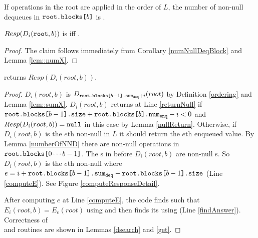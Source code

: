 \begin{corollary}\label{numNullDeqBlock}
  If operations in the root are applied in the order of $L$, the number of non-null dequeues in ${\normalfont{\texttt{root.blocks[}}}b{\normalfont{\texttt{]}}}$ is .
\end{corollary}

\begin{lemma}\label{nullReturn}
$Resp(D_i({\normalfont{\texttt{root}}},b))$ is  iff .
\end{lemma}
\begin{proof}
The claim follows immediately from Corollary  \ref{numNullDeqBlock} and Lemma \ref{lem::numX}.
\end{proof}

\begin{lemma}\label{computeHead}
 returns $Resp(D_i(root,b))$.
\end{lemma}
\begin{proof}
$D_i(root,b)$ is $D_{{\normalfont{\texttt{root.blocks[}}}b-1{\normalfont{\texttt{].sum\textsubscript{deq}}}}+i}(root)$ by Definition \ref{ordering} and Lemma \ref{lem::sumX}. $D_i(root,b)$ returns  at Line \ref{returnNull} if ${\normalfont{\texttt{root.blocks[}}}b-1{\normalfont{\texttt{].size}}}+ {\normalfont{\texttt{root.blocks[}}}b{\normalfont{\texttt{].num\textsubscript{enq}}}}- i <0$ and $Resp(D_i(root,b))={\normalfont{\texttt{null}}}$ in this case by Lemma \ref{nullReturn}. Otherwise, if $D_i(root,b)$ is the $e$th non-null  in $L$ it should return the $e$th enqueued value. By Lemma \ref{numberOfNND} there are  non-null  operations in ${\normalfont{\texttt{root.blocks[}}}0\cdots b-1{\normalfont{\texttt{]}}}$. The s in  before $D_i(root,b)$ are non-null s. So $D_i(root,b)$ is the $e$th non-null  where $e= i + {\normalfont{\texttt{root.blocks[}}}b-1{\normalfont{\texttt{].sum\textsubscript{deq}}}} - {\normalfont{\texttt{root.blocks[}}}b-1{\normalfont{\texttt{].size}}}$ (Line \ref{computeE}). See Figure \ref{computeResponseDetail}.

After computing $e$ at Line \ref{computeE}, the code finds  such that $E_i(root,b)=E_e(root)$ using  and then finds its  using  (Line \ref{findAnswer}). Correctness of \\ and  routines are shown in Lemmas \ref{dsearch} and \ref{get}.
\end{proof}

